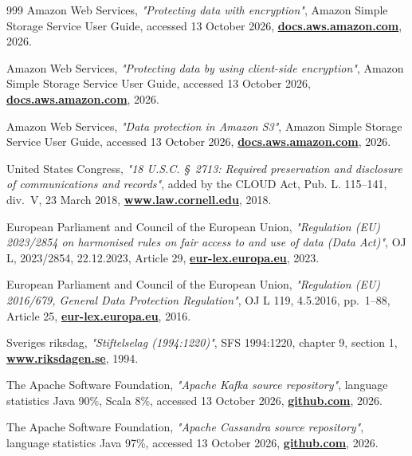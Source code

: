 \documentclass[a4paper,oneside]{article}
\let\oldhref\href
\renewcommand{\href}[2]{\oldhref{#1}{\bfseries#2}}
\begin{document}
\begin{thebibliography}{999}
	Amazon Web Services,
	\emph{"Protecting data with encryption"},
	Amazon Simple Storage Service User Guide, accessed 13 October 2026,
	\href{https://docs.aws.amazon.com/AmazonS3/latest/userguide/UsingEncryption.html}{docs.aws.amazon.com},
	2026.

	Amazon Web Services,
	\emph{"Protecting data by using client-side encryption"},
	Amazon Simple Storage Service User Guide, accessed 13 October 2026,
	\href{https://docs.aws.amazon.com/AmazonS3/latest/userguide/UsingClientSideEncryption.html}{docs.aws.amazon.com},
	2026.

	Amazon Web Services,
	\emph{"Data protection in Amazon S3"},
	Amazon Simple Storage Service User Guide, accessed 13 October 2026,
	\href{https://docs.aws.amazon.com/AmazonS3/latest/userguide/DataDurability.html}{docs.aws.amazon.com},
	2026.

	United States Congress,
	\emph{"18 U.S.C. \S~2713: Required preservation and disclosure of communications and records"},
	added by the CLOUD Act, Pub. L. 115--141, div.~V, 23 March 2018,
	\href{https://www.law.cornell.edu/uscode/text/18/2713}{www.law.cornell.edu},
	2018.

	European Parliament and Council of the European Union,
	\emph{"Regulation (EU) 2023/2854 on harmonised rules on fair access to and use of data (Data Act)"},
	OJ L, 2023/2854, 22.12.2023, Article 29,
	\href{https://eur-lex.europa.eu/eli/reg/2023/2854/oj}{eur-lex.europa.eu},
	2023.

	European Parliament and Council of the European Union,
	\emph{"Regulation (EU) 2016/679, General Data Protection Regulation"},
	OJ L 119, 4.5.2016, pp.~1--88, Article 25,
	\href{https://eur-lex.europa.eu/eli/reg/2016/679/oj}{eur-lex.europa.eu},
	2016.

	Sveriges riksdag,
	\emph{"Stiftelselag (1994:1220)"},
	SFS 1994:1220, chapter 9, section 1,
	\href{https://www.riksdagen.se/sv/dokument-och-lagar/dokument/svensk-forfattningssamling/stiftelselag-19941220_sfs-1994-1220/}{www.riksdagen.se},
	1994.

	The Apache Software Foundation,
	\emph{"Apache Kafka source repository"},
	language statistics Java 90\%, Scala 8\%, accessed 13 October 2026,
	\href{https://github.com/apache/kafka}{github.com},
	2026.

	The Apache Software Foundation,
	\emph{"Apache Cassandra source repository"},
	language statistics Java 97\%, accessed 13 October 2026,
	\href{https://github.com/apache/cassandra}{github.com},
	2026.


\end{thebibliography}
\end{document}
